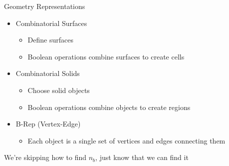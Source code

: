 \documentclass[xcolor=x11names,compress]{beamer}
\renewcommand{\(}{\begin{columns}}
\renewcommand{\)}{\end{columns}}
\newcommand{\<}[1]{\begin{column}{#1}}
\renewcommand{\>}{\end{column}}
\begin{document}
\begin{frame}{Geometry Representations}

\begin{itemize}
  \item Combinatorial Surfaces
  \begin{itemize}
    \item Define surfaces
    \item Boolean operations combine surfaces to create cells
  \end{itemize}
  \vspace*{1 em}
  \item Combinatorial Solids
  \begin{itemize}
    \item Choose solid objects
    \item Boolean operations combine objects to create regions
  \end{itemize}
  \vspace*{1 em}
  \item B-Rep (Vertex-Edge)
  \begin{itemize}
    \item Each object is a single set of vertices and edges connecting them
  \end{itemize}
\end{itemize}
\vspace*{1 em}
We're skipping how to find $n_b$, just know that we can find it

\end{frame}
\end{document}
